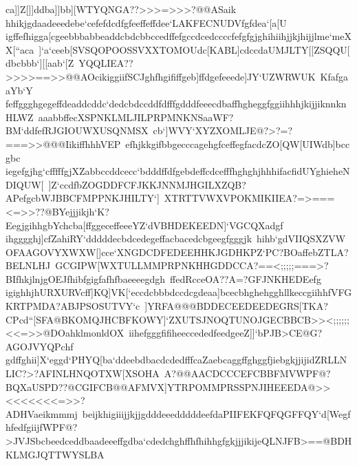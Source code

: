 {{{ ca]]Z[]]ddba]]bb][WTYQNGA??>>>=>>>?@@ASaik%
 hhikjgdaadeeedebe`cefefdcdfgfeeffeffdee`LAKFECNUDVfgfdea`[a[U}
 \hbox{igffefhigga[cgeebbbabbeaddcbdcbbccedffefgccdcedccccfefgfgjghihiihjjkjhijjlme`meXX[``aca%
 ]`a`ceeb[SVSQOPOOSSVXXTOMOUdc[KABL]cdccdaUMJLTY[[ZSQQU[dbcbbb`][[aab`[Z%
 YQQLIEA??>>>>==>>@@AOcikiggiifSCJghfhgififfgeb]ffdgefeeede]JY`UZWRWUK%
 KfafgaaYb`Y}
 \hbox{feffggghgegeffdeaddcddc`dedcbdccddfdfffgdddfeeecdbaffhgheggfggiihhhjkijjiknnknHLWZ%
 aaabbffecXSPNKLMLJILPRPMNKNSaaWF?BM`ddfefRJGIOUWXUSQNMSX%
 cb`]WVY`XYZXOMLJE@?>?=?===>>@@@IikiffhhhVEP%
 efhjkkgifbbgecccagehgfceffegfacdcZO[QW[UIWdb]bccgbc}
 \hbox{iegefgjhg`cfffffgjXZabbccddcecc`bdddffdfgebdeffcdcefffhghghjhhhifacfidUYghieheNDIQUW[%
 ]Z`ccdfbZOGDDFCFJKKJNNMJHGILXZQB?APefgcbWJBBCFMPPNKJHILTY`]%
 XTRTTVWXVPOKMIKIIEA?=>===<=>>??@BYejjjikjh`K?EegjgihhgbYchcba[ffggeceffeeeYZ`dVBHDEKEEDN]`VGCQXadgf}
 \hbox{ihgggghj]cfZahiRY`dddddecbdcedegeffacbacedcbgeegfgggjk%
 hihb`gdVIIQSXZVWOFAAGOVYXWXW[]cce`XNGDCDFEDEEHHKJGDHKPZ`PC?BOaffebZTLA?BELNLHJ%
 GCGIPW[WXTULLMMPRPNKHHGDDCCA?==<;;;;;===>?BIfhkjlnjgOEJfhibfgigfafhfbaeeeegdgh%
 ffedRcceOA??A=?GFJNKHEDEefg}
 \hbox{igighhjhURXURVcff]KQ]VK[`eccdcbbbdccdcgdeaa]bcecbhghehgghllkeccgiihhfVFGKRTPMDA?ABJPSOSUTVY`c%
 ]YRFA@@@BDDECEEDEEDEGRS[TKA?CPcd``[SFA@BKOMQJHCBFKOWY]`ZXUTSJNOQTUNOJGECBBCB>><;;;;;;<<=>>@DOahklmonldOX%
 iihefgggfifiheeccededfeedgeeZ]]`bPJB>CE@G?AGOJVYQPchf}
 \hbox{gdffghii]X`eggd`PHYQ[ba`ddeebdbacdcdedfffcaZaebcaggffghggfjiebgkjjijidZRLLNLIC?>?AFINLHNQOTXW[XSOHA%
 A?@@AACDCCCEFCBBFMVWPF@?BQXaUSPD??@CGIFCB@@AFMVX]YTRPOMMPRSSPNJIHEEEDA@>><<<<<<<=>>?ADHVaeikmmmj%
 beijkhigiiijjkjjgdddeeedddddeefdaPIIFEKFQFQGFFQY`d[Wegf}
 \hbox{hfedfgiijfWPF@?>JVJSbcbeedceddbaadeeeffgdba`cdedchghffhfhihhgfgkjjjikijeQLNJFB>==@BDHKLMGJQTTWYSLBA%
}}}
